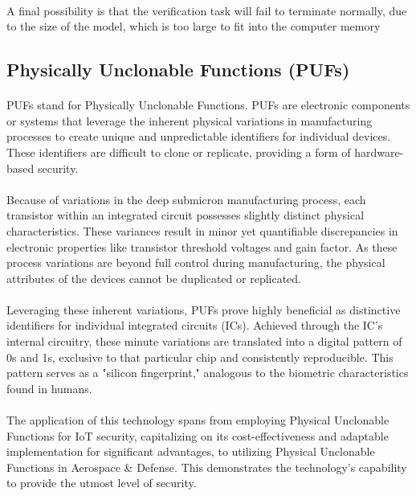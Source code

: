 \begin{enumerate}
\begin{itemize}
		\paragraph*{}
		A final possibility is that the verification task will fail to terminate normally, due to the size of the model, which is too large to fit into the computer memory
				
	\end{itemize} 
	
\end{enumerate}

\subsection{Physically Unclonable Functions (PUFs)}
\paragraph*{}
PUFs stand for Physically Unclonable Functions. PUFs are electronic components or systems that leverage the inherent physical variations in manufacturing processes to create unique and unpredictable identifiers for individual devices. These identifiers are difficult to clone or replicate, providing a form of hardware-based security.
\paragraph*{}
Because of variations in the deep submicron manufacturing process, each transistor within an integrated circuit possesses slightly distinct physical characteristics. These variances result in minor yet quantifiable discrepancies in electronic properties like transistor threshold voltages and gain factor. As these process variations are beyond full control during manufacturing, the physical attributes of the devices cannot be duplicated or replicated.
\paragraph*{}
Leveraging these inherent variations, PUFs prove highly beneficial as distinctive identifiers for individual integrated circuits (ICs). Achieved through the IC's internal circuitry, these minute variations are translated into a digital pattern of 0s and 1s, exclusive to that particular chip and consistently reproducible. This pattern serves as a "silicon fingerprint," analogous to the biometric characteristics found in humans.
\paragraph*{}
The application of this technology spans from employing Physical Unclonable Functions for IoT security, capitalizing on its cost-effectiveness and adaptable implementation for significant advantages, to utilizing Physical Unclonable Functions in Aerospace \& Defense. This demonstrates the technology's capability to provide the utmost level of security.
